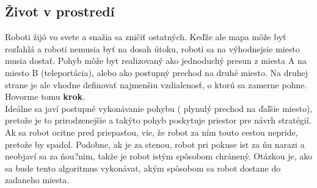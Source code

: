 \subsection{Život v prostredí} %
Roboti žijô vo svete a snažia sa zničiť ostatných. Keďže ale mapa môže byť rozľahlá a roboti nemusia byť na dosah útoku, roboti sa na výhodnejsie miesto musia dostať. Pohyb môže byt realizovaný ako jednoduchý presun z miesta A na miesto B (teleportácia), alebo ako postupný prechod na druhé miesto. Na druhej strane je ale vhodne definovať najmenšiu vzdialenosť, o ktorú sa zamerne pohne. Hovorme tomu {\bf krok}.\\ %
Ideálne sa javí postupné vykonávanie pohybu ( plynulý prechod na ďaľšie miesto), pretože je to prirodzenejšie a takýto pohyb poskytuje priestor pre návrh stratégií. Ak sa robot ocitne pred priepasťou, vie, že robot za ním touto cestou nepride, pretože by spadol.  Podobne, ak je za stenou, robot  pri pokuse ist za ňu narazi a neobjaví sa za ňou?nim, takže je robot istým spôsobom chránený. Otázkou je, ako sa bude tento algoritmus vykonávat, akým spôsobom sa robot dostane do zadaneho miesta. 
